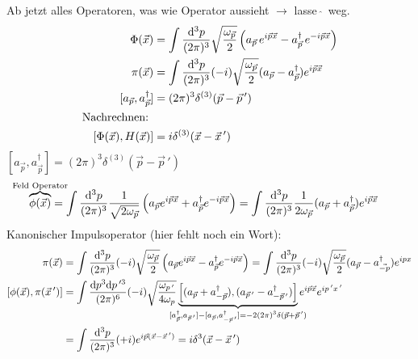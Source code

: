 Ab jetzt alles Operatoren, was wie Operator aussieht $\rightarrow$ lasse \,$\hat{}$\, weg.
	\begin{align*}
		\Phi(\vec{x}) &= \int \frac{\mathrm{d}^3 p}{(2\pi)^3} 
		\sqrt{\frac{\omega_{\vec{p}}}{2}} 
		\left(
			a_{\vec{p}}\, e^{i \vec{p} \vec{x}} -
			a^\dagger_{\vec{p}} \,e^{- i \vec{p} \vec{x}}
		\right) \\
		\pi (\vec{x}) &= \int \frac{\mathrm{d}^3 p}{(2 \pi)^3} (-i) \sqrt{\frac{\omega_{\vec{p}}}{2}} (a_{\vec{p}} - a_{\vec{p}}^\dagger)
		e^{i \vec{p}\vec{x}} \\
		[a_{\vec{p}}, a_{\vec{p}}^\dagger] &= (2\pi)^3 \delta^{(3)}(\vec{p}- \vec{p}\,') \\			
		\text{Nachrechnen: } \\ [\Phi(\vec{x}), H(\vec{x})] &= i \delta^{(3)}(\vec{x}- \vec{x}\,')
	\end{align*}
$[a_{\vec{p}}, a_{\vec{p}}^\dagger] = (2\pi)^3 \delta^{(3)} (\vec{p} - \vec{p}\,')$ 
	\begin{align*}
		\overbrace{\phi (\vec{x})}^{\mathclap{\text{Feld Operator}}} &= \int \frac{\diff^3 p}{(2 \pi)^3} \frac{1}{\sqrt{2 \omega_{\vec{p}}}} 
		\left(
			a_{\vec{p}} e^{i \vec{p} \vec{x}} + a_{\vec{p}}^\dagger e^{-i\vec{p} \vec{x}}
		\right) 
		= \int \frac{\diff^3 p}{(2\pi)^3} \frac{1}{2 \omega_{\vec{p}}} (a_{\vec{p}} + a_{\vec{p}}^\dagger) e^{i \vec{p} \vec{x}}
	\end{align*}
Kanonischer Impulsoperator (hier fehlt noch ein Wort):
	\begin{align*}
		\pi (\vec{x}) &= \int \frac{\diff^3 p}{(2\pi)^3} (-i) \sqrt{\frac{\omega_{\vec{p}}}{2}} 
		\left(
			a_{\vec{p}} e^{i\vec{p} \vec{x}} - a^\dagger_{\vec{p}} e^{-i\vec{p} \vec{x}}
		\right) 
		= \int \frac{\diff^3 p}{(2\pi)^3} (-i) \sqrt{\frac{\omega_{\vec{p}}}{2}} 
		(a_{\vec{p}} - a_{\vec{-p}}^\dagger) e^{ipx} \\
		[\phi(\vec{x}), \pi(\vec{x}\,')] &=
		\int \frac{\diff p^3 \diff p\,'^3}{(2\pi)^6} (-i) \sqrt{\frac{\omega_{p\,'}}{4 \omega_p}} 
		\underbrace{
		\left[
			(a_{\vec{p}} + a_{-\vec{p}}^\dagger), (a_{\vec{p}\,'} - a_{-\vec{p}\,'}^\dagger)
		\right]}_{\mathclap{
				[a_{\vec{p}}^\dagger, a_{\vec{p}\,'}] - [a_{\vec{p}}, a_{-\vec{p}\,'}^\dagger] = -2 (2\pi)^3 \delta (\vec{p}+\vec{p}\,')
			}}
		e^{i\vec{p}\vec{x}} e^{i p\,' x\,'} \\
		&= \int \frac{\diff^3 p}{(2\pi)^3} (+i) e^{i \vec{p} (\vec{x}- \vec{x}\,')} = 
		i\delta^3(\vec{x}- \vec{x}\,')
	\end{align*}

